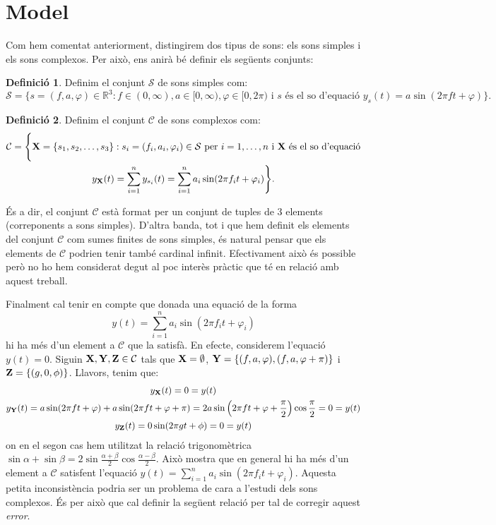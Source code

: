 \documentclass{article}
\theoremstyle{definition}
\newtheorem{definition}{Definició}[section]
\newcommand{\0}{\ensuremath{\vb{0}}}
\newcommand{\X}{\ensuremath{\vb{X}}}
\newcommand{\Y}{\ensuremath{\vb{Y}}}
\newcommand{\Z}{\ensuremath{\vb{Z}}}
\newcommand{\RR}{\ensuremath{\mathbb{R}}} %
\begin{document}
\section{Model}
Com hem comentat anteriorment, distingirem dos tipus de sons: els sons simples i els sons complexos. Per això, ens anirà bé definir els següents conjunts:
\begin{definition}
    Definim el conjunt $\mathcal{S}$ de sons simples com: $$\mathcal{S}=\{s=(f,a,\varphi)\in\RR^3:f\in(0,\infty),a\in[0,\infty),\varphi\in[0,2\pi)\text{ i $s$ és el so d'equació }y_s(t)=a\sin(2\pi ft+\varphi)\}.$$
\end{definition}
\begin{definition}
    Definim el conjunt $\mathcal{C}$ de sons complexos com:
    \begin{multline*}
        \mathcal{C}=\Bigg\{\X=\{s_1,s_2,\ldots,s_3\}:s_i=(f_i,a_i,\varphi_i)\in\mathcal{S}\text{ per } i=1,\ldots,n\text{ i $\X$ és el so d'equació}\\y_{\X}(t)=\sum_{i=1}^ny_{s_i}(t)=\sum_{i=1}^na_i\sin(2\pi f_it+\varphi_i)\Bigg\}.
    \end{multline*}
\end{definition}
És a dir, el conjunt $\mathcal{C}$ està format per un conjunt de tuples de 3 elements (correponents a sons simples). D'altra banda, tot i que hem definit els elements del conjunt $\mathcal{C}$ com sumes finites de sons simples, és natural pensar que els elements de $\mathcal{C}$ podrien tenir també cardinal infinit. Efectivament això és possible però no ho hem considerat degut al poc interès pràctic que té en relació amb aquest treball.\par Finalment cal tenir en compte que donada una equació de la forma $$y(t)=\sum_{i=1}^na_i\sin(2\pi f_it+\varphi_i)$$ hi ha més d'un element a $\mathcal{C}$ que la satisfà. En efecte, considerem l'equació $y(t)=0$. Siguin $\X,\Y,\Z\in\mathcal{C}$ tals que $\X=\emptyset$, $\Y=\{(f,a,\varphi),(f,a,\varphi+\pi)\}$ i $\Z=\{(g,0,\phi)\}$. Llavors, tenim que:
\begin{gather*}
    y_{\X}(t)=0=y(t)\\
    y_{\Y}(t)=a\sin(2\pi ft+\varphi)+a\sin(2\pi ft+\varphi+\pi)=2a\sin\left(2\pi ft+\varphi +\frac{\pi}{2}\right)\cos\frac{\pi}{2}=0=y(t)\\
    y_{\Z}(t)=0\sin(2\pi gt+\phi)=0=y(t)
\end{gather*}
on en el segon cas hem utilitzat la relació trigonomètrica $\sin\alpha+\sin\beta=2\sin\frac{\alpha+\beta}{2}\cos\frac{\alpha-\beta}{2}$. Això mostra que en general hi ha més d'un element a $\mathcal{C}$ satisfent l'equació $y(t)=\sum_{i=1}^na_i\sin(2\pi f_it+\varphi_i)$. Aquesta petita inconsistència podria ser un problema de cara a l'estudi dels sons complexos. És per això que cal definir la següent relació per tal de corregir aquest \textit{error}.
\end{document}
